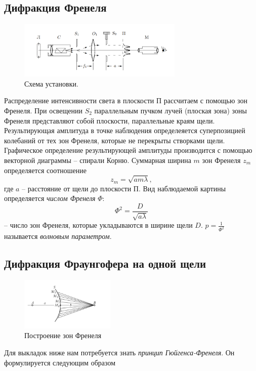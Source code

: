 \documentclass[a4paper]{article}
\begin{document}
\subsection{Дифракция Френеля}
\begin{figure}[h]
\includegraphics[width=0.7\textwidth]{1.png}
\centering
\caption{Схема установки.}
\end{figure}
Распределение интенсивности света в плоскости П рассчитаем с помощью зон Френеля. При освещении $S_2$ параллельным пучком лучей (плоская зона) зоны Френеля представляют собой плоскости, параллельные краям щели. Результирующая амплитуда в точке наблюдения определеяется суперпозицией колебаний от тех зон Френеля, которые не перекрыты створками щели. Графическое определение результирующей амплитуды производится с помощью векторной диаграммы -- спирали Корню. Суммарная ширина $m$ зон Френеля $z_m$ определяется соотношение
\begin{equation}
z_m = \sqrt{am\lambda},
\end{equation}
где $a$ -- расстояние от щели до плоскости П. Вид наблюдаемой картины определяется \textit{числом Френеля} $\Phi$:
$$
\Phi^2 = \frac{D}{\sqrt{a\lambda}}
$$
-- число зон Френеля, которые укладываются в ширине щели $D$. $p = \frac{1}{\Phi^2}$ называется \textit{волновым параметром}. 
\subsection{Дифракция Фраунгофера на одной щели}

\begin{figure}
  \begin{center}
    \includegraphics[width = 0.4\textwidth]{2.png}
  \end{center}
  \caption{Построение зон Френеля}
\end{figure}
Для выкладок ниже нам потребуется знать \textit{принцип Гюйгенса-Френеля}. Он формулируется следующим образом 
\end{document}
